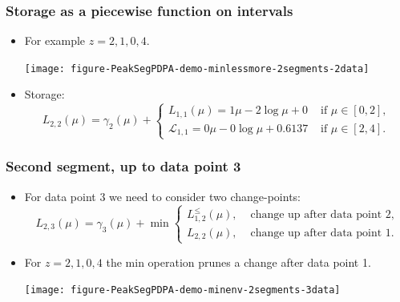 \documentclass{beamer}
\begin{document}
\begin{frame}
  \frametitle{Storage as a piecewise function on intervals}
  \begin{itemize}
  \item For example $z = 2, 1, 0, 4$.
    \begin{center}
      \texttt{[image: figure-PeakSegPDPA-demo-minlessmore-2segments-2data]}
    \end{center}
  \item Storage: 
    \begin{equation*}
      L_{2,2}(\mu) = \gamma_2(\mu) + 
      \begin{cases}
        L_{1,1}(\mu) = 1\mu - 2\log \mu + 0 & \text{ if } \mu\in[0, 2],\\
        \mathcal L_{1,1} = 0\mu -0\log\mu + 0.6137 & \text{ if } \mu\in[2, 4].
      \end{cases}
    \end{equation*}
  \end{itemize}
\end{frame}

 
\begin{frame}[fragile]
  \frametitle{Second segment, up to data point 3}
  \begin{itemize}
  \item For data point 3 we need to consider two change-points:
    \begin{equation*}
      L_{2,3}(\mu) =  \gamma_3(\mu) + \min
      \begin{cases}
        L_{1,2}^{\leq}(\mu), & \text{ change up after data point 2},\\
        L_{2,2}(\mu), & \text{ change up after data point 1}. 
      \end{cases}
    \end{equation*}
  \item For $z = 2, 1, 0, 4$ the min operation prunes a
    change after data point 1.
    \begin{center}
      \texttt{[image: figure-PeakSegPDPA-demo-minenv-2segments-3data]}
    \end{center}
  \end{itemize}
\end{frame}
\end{document}
